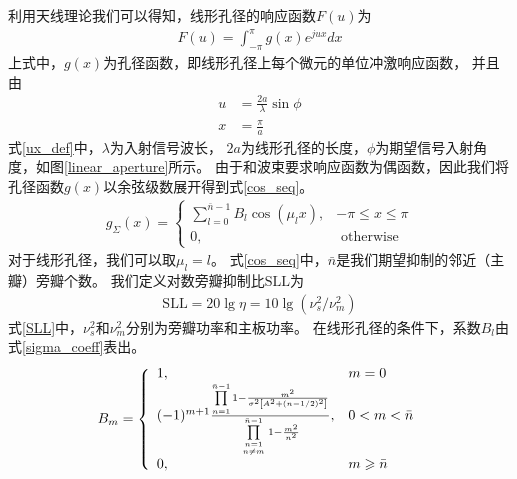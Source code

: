\documentclass[master]{thesis-uestc}
\begin{document}
利用天线理论我们可以得知，线形孔径的响应函数$F(u)$为
\begin{equation}\label{aperture_response}
    \begin{aligned}
        F(u) = \int_{-\pi}^\pi g(x)e^{jux}dx
    \end{aligned}
\end{equation}
上式中，$g(x)$为孔径函数，即线形孔径上每个微元的单位冲激响应函数，
并且由
\begin{subequations}\label{ux_def}
    \begin{align}
        u &= \frac{2a}{\lambda}\sin\phi
        \\
        x &= \frac{\pi}{a}
    \end{align}
\end{subequations}
式\eqref{ux_def}中，$\lambda$为入射信号波长，
$2a$为线形孔径的长度，$\phi$为期望信号入射角度，如图\ref{linear_aperture}所示。
由于和波束要求响应函数为偶函数，因此我们将孔径函数$g(x)$以余弦级数展开得到式\eqref{cos_seq}。
\begin{equation}\label{cos_seq}
    \begin{aligned}
        g_{\Sigma}(x)=\left\{\begin{array}{ll}
        \sum\limits_{l=0}^{\bar{n}-1} B_{l} \cos \left(\mu_{l} x\right), & -\pi \leqslant x \leqslant \pi
        \\
        0, & \text { otherwise }
        \end{array}\right.
    \end{aligned}
\end{equation}
对于线形孔径，我们可以取$\mu_l=l$。
式\eqref{cos_seq}中，$\bar{n}$是我们期望抑制的邻近（主瓣）旁瓣个数。
我们定义对数旁瓣抑制比$\text{SLL}$为
\begin{equation}\label{SLL}
    \begin{aligned}
        \text{SLL} = 20\lg\eta = 10\lg\left(\nu_s^2/\nu_m^2\right)
    \end{aligned}
\end{equation}
式\eqref{SLL}中，$\nu_s^2$和$\nu_m^2$分别为旁瓣功率和主板功率。
在线形孔径的条件下，系数$B_l$由式\eqref{sigma_coeff}表出。
\begin{equation}\label{sigma_coeff}
    \begin{aligned}
        B_{m}=\left\{\begin{array}{ll}
        1, & m=0 \\
        (-1)^{m+1} \frac{\prod\limits_{n=1}^{\bar{n}-1} 1-\frac{m^{2}}{\sigma^{2}\left[A^{2}+(n-1 / 2)^{2}\right]}}{\prod\limits_{n=1 \atop n \neq m}^{\bar{n}-1} 1-\frac{m^{2}}{n^{2}}}, & 0<m<\bar{n} \\
        0, & m \geqslant \bar{n}
        \end{array}\right.
    \end{aligned}
\end{equation}
\end{document}
